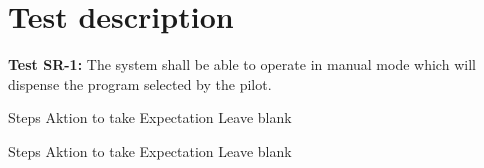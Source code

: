 \documentclass[Main]{subfiles}
\begin{document}
\chapter{Test description}

\textbf{Test SR-1: }
 The system shall be able to operate in manual mode which will dispense the program selected by the pilot.

\begin{TestCaseIntro}
\end{TestCaseIntro}

\begin{TestCase}
\TC
{Steps}
{Aktion to take}
{Expectation}
{Leave blank}

\TC
{Steps}
{Aktion to take}
{Expectation}
{Leave blank}
\end{TestCase}
\end{document}
